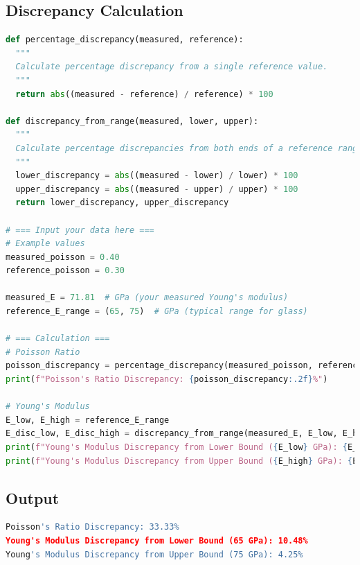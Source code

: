 \documentclass[a4paper,11pt]{article}
\begin{document}
\subsection{Discrepancy Calculation}
\begin{lstlisting}[language=Python]
def percentage_discrepancy(measured, reference):
  """
  Calculate percentage discrepancy from a single reference value.
  """
  return abs((measured - reference) / reference) * 100

def discrepancy_from_range(measured, lower, upper):
  """
  Calculate percentage discrepancies from both ends of a reference range.
  """
  lower_discrepancy = abs((measured - lower) / lower) * 100
  upper_discrepancy = abs((measured - upper) / upper) * 100
  return lower_discrepancy, upper_discrepancy

# === Input your data here ===
# Example values
measured_poisson = 0.40
reference_poisson = 0.30

measured_E = 71.81  # GPa (your measured Young's modulus)
reference_E_range = (65, 75)  # GPa (typical range for glass)

# === Calculation ===
# Poisson Ratio
poisson_discrepancy = percentage_discrepancy(measured_poisson, reference_poisson)
print(f"Poisson's Ratio Discrepancy: {poisson_discrepancy:.2f}%")

# Young's Modulus
E_low, E_high = reference_E_range
E_disc_low, E_disc_high = discrepancy_from_range(measured_E, E_low, E_high)
print(f"Young's Modulus Discrepancy from Lower Bound ({E_low} GPa): {E_disc_low:.2f}%")
print(f"Young's Modulus Discrepancy from Upper Bound ({E_high} GPa): {E_disc_high:.2f}%")
\end{lstlisting}
\label{Code: 6}

\newpage
\subsection{Output}
\begin{lstlisting}[language=Python]
Poisson's Ratio Discrepancy: 33.33%
Young's Modulus Discrepancy from Lower Bound (65 GPa): 10.48%
Young's Modulus Discrepancy from Upper Bound (75 GPa): 4.25%
\end{lstlisting}
\label{output: 4}
\end{document}
